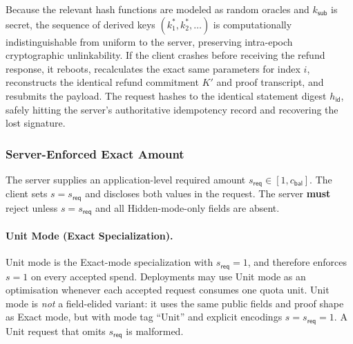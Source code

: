\documentclass[11pt]{article}
\theoremstyle{definitionstyle}
\theoremstyle{plain}
\begin{document}
Because the relevant hash functions are modeled as random oracles and $k_{\mathsf{sub}}$ is secret, the sequence of derived keys $(k_1^*, k_2^*, \dots)$ is computationally indistinguishable from uniform to the server, preserving intra-epoch cryptographic unlinkability. If the client crashes before receiving the refund response, it reboots, recalculates the exact same parameters for index $i$, reconstructs the identical refund commitment $K'$ and proof transcript, and resubmits the payload. The request hashes to the identical statement digest $h_{\mathsf{id}}$, safely hitting the server's authoritative idempotency record and recovering the lost signature.

\subsubsection{Server-Enforced Exact Amount}
\label{sec:spend-exact}

The server supplies an application-level required amount $s_{\mathsf{req}} \in [1, c_{\mathsf{bal}}]$. The client sets $s = s_{\mathsf{req}}$ and discloses both values in the request. The server \textbf{must} reject unless $s = s_{\mathsf{req}}$ and all Hidden-mode-only fields are absent.

\paragraph{Unit Mode (Exact Specialization).}
Unit mode is the Exact-mode specialization with $s_{\mathsf{req}}=1$, and therefore enforces $s=1$ on every accepted spend. Deployments may use Unit mode as an optimisation whenever each accepted request consumes one quota unit. Unit mode is \emph{not} a field-elided variant: it uses the same public fields and proof shape as Exact mode, but with mode tag $\text{``Unit''}$ and explicit encodings $s = s_{\mathsf{req}} = 1$. A Unit request that omits $s_{\mathsf{req}}$ is malformed.
\end{document}
